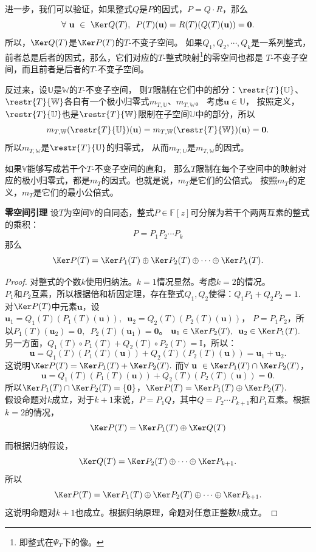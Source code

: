 \documentclass[12pt,UTF8]{ctexbook}
\begin{document}
进一步，我们可以验证，如果整式$Q$是$P$的因式，$P = Q\cdot R$，那么
$$ \forall \,\, \mathbf{u} \,\,\in \,\, \Ker Q(T),\,\,\, P(T)(\mathbf{u}) = R(T)(Q(T)(\mathbf{u})) = \mathbf{0}.$$
所以，$\Ker Q(T)$是$\Ker P(T)$的$T$-不变子空间。
如果$Q_1, Q_2, \cdots ,Q_k$是一系列整式，前者总是后者的因式，那么，它们对应的$T$-整式映射\footnote{即整式在$\Psi_T$下的像。}的零空间也都是
$T$-不变子空间，而且前者是后者的$T$-不变子空间。

反过来，设$\mathbb{U}$是$\mathbb{W}$的$T$-不变子空间，
则$T$限制在它们中的部分：$\restr{T}{\mathbb{U}}$、$\restr{T}{\mathbb{W}}$各自有一个极小归零式$m_{T,\mathbb{U}}$、$m_{T,\mathbb{W}}$。
考虑$\mathbf{u} \in \mathbb{U}$，
按照定义，$\restr{T}{\mathbb{U}}$也是$\restr{T}{\mathbb{W}}$限制在子空间$\mathbb{U}$中的部分，所以
$$m_{T,\mathbb{W}}(\restr{T}{\mathbb{U}})(\mathbf{u}) = m_{T,\mathbb{W}}(\restr{T}{\mathbb{W}})(\mathbf{u}) = \mathbf{0}.$$
所以$m_{T,\mathbb{W}}$是$\restr{T}{\mathbb{U}}$的归零式，
从而$m_{T,\mathbb{U}}$是$m_{T,\mathbb{W}}$的因式。

如果$\mathbb{V}$能够写成若干个$T$-不变子空间的直和，
那么$T$限制在每个子空间中的映射对应的极小归零式，都是$m_T$的因式。也就是说，$m_T$是它们的公倍式。
按照$m_T$的定义，$m_T$是它们的最小公倍式。

\begin{pp}\textbf{零空间引理}\label{pp:6_4}
    设$T$为空间$\mathbb{V}$的自同态，整式$P\in\mathbb{F}[z]$可分解为若干个两两互素的整式的乘积：
    $$ P = P_1 P_2\cdots P_k$$
    那么
    $$ \Ker P(T) = \Ker P_1(T) \oplus \Ker P_2(T) \oplus \cdots \oplus \Ker P_k(T). $$
\end{pp}
\begin{proof} %
    对整式的个数$k$使用归纳法。$k=1$情况显然。考虑$k=2$的情况。\\
    $P_1$和$P_2$互素，所以根据倍和析因定理，存在整式$Q_1, Q_2$使得：$Q_1 P_1 + Q_2 P_2 = 1.$\\
    对$\Ker P(T)$中元素$\mathbf{u}$，设$\mathbf{u}_1 = Q_1(T)(P_1(T)(\mathbf{u})), \,\,\, \mathbf{u}_2 = Q_2(T)(P_2(T)(\mathbf{u}))$，
    $P = P_1 P_2$，所以$P_1(T)(\mathbf{u}_2) = \mathbf{0}, \,\,\, P_2(T)(\mathbf{u}_1) = \mathbf{0}$。
    $\mathbf{u}_1 \in \Ker P_2(T), \,\,\, \mathbf{u}_2 \in \Ker P_1(T).$
    另一方面，$Q_1(T) \circ P_1(T) + Q_2(T) \circ P_2(T) = \mathrm{I}$，所以：
    $$ \mathbf{u} = Q_1(T)(P_1(T)(\mathbf{u})) + Q_2(T)(P_2(T)(\mathbf{u})) = \mathbf{u}_1 + \mathbf{u}_2.$$
    这说明$\Ker P(T) = \Ker P_1(T) + \Ker P_2(T).$
    而$\forall \,\, \mathbf{u} \,\, \in \Ker P_1(T) \cap \Ker P_2(T)$，
    $$ \mathbf{u} = Q_1(T)(P_1(T)(\mathbf{u})) + Q_2(T)(P_2(T)(\mathbf{u})) = \mathbf{0}. $$
    所以$\Ker P_1(T) \cap \Ker P_2(T) = \{\mathbf{0}\}$，$\Ker P(T) = \Ker P_1(T) \oplus \Ker P_2(T).$\\
    假设命题对$k$成立，对于$k+1$来说，$P = P_1 Q$，其中$Q = P_2 \cdots P_{k+1}$和$P_1$互素。根据$k=2$的情况， 
    $$ \Ker P(T) = \Ker P_1(T) \oplus \Ker Q(T)$$
    而根据归纳假设，
    $$ \Ker Q(T) = \Ker P_2(T) \oplus \cdots \oplus \Ker P_{k+1}.$$
    所以
    $$ \Ker P(T) = \Ker P_1(T) \oplus \Ker P_2(T) \oplus \cdots \oplus \Ker P_{k+1}.$$
    这说明命题对$k+1$也成立。根据归纳原理，命题对任意正整数$k$成立。
    
\end{proof}
\end{document}
